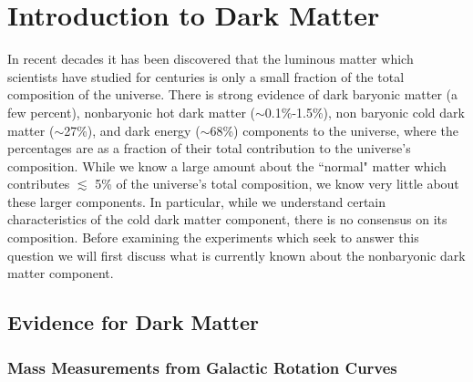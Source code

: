 \documentclass[a4paper,12pt]{article}
\begin{document}









\newcommand{\overbar}[1]{\mkern 1.5mu\overline{\mkern-1.5mu#1\mkern-1.5mu}\mkern 1.5mu}

\begingroup
\singlespacing
\tableofcontents
\listoftables
\listoffigures
\endgroup


\section{Introduction to Dark Matter}



In recent decades it has been discovered that the luminous matter which scientists have studied for centuries is only a small fraction of the total composition of the universe.  There is strong evidence of dark baryonic matter (a few percent), nonbaryonic hot dark matter ($\sim$0.1\%-1.5\%), non baryonic cold dark matter ($\sim$27\%), and dark energy ($\sim$68\%) components to the universe, where the percentages are as a fraction of their total contribution to the universe's composition.  While we know a large amount about the ``normal" matter which contributes $ \lesssim $ 5\% of the universe's total composition, we know very little about these larger components.  In particular, while we understand certain characteristics of the cold dark matter component, there is no consensus on its composition.  Before examining the experiments which seek to answer this question we will first discuss what is currently known about the nonbaryonic dark matter component.

\subsection{Evidence for Dark Matter}

\subsubsection{Mass Measurements from Galactic Rotation Curves}
\end{document}
